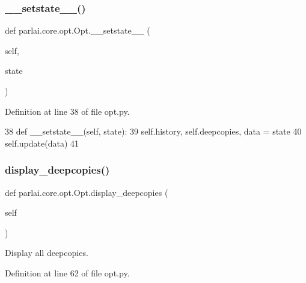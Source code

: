 \subsubsection{\texorpdfstring{\+\_\+\+\_\+setstate\+\_\+\+\_\+()}{\_\_setstate\_\_()}}
{\footnotesize\ttfamily def parlai.\+core.\+opt.\+Opt.\+\_\+\+\_\+setstate\+\_\+\+\_\+ (\begin{DoxyParamCaption}\item[{}]{self,  }\item[{}]{state }\end{DoxyParamCaption})}



Definition at line 38 of file opt.\+py.


\begin{DoxyCode}
38     \textcolor{keyword}{def }\_\_setstate\_\_(self, state):
39         self.history, self.deepcopies, data = state
40         self.update(data)
41 
\end{DoxyCode}
\mbox{\label{classparlai_1_1core_1_1opt_1_1Opt_acf39fc241e237d49671e61ff5ee8b95b}} 
\subsubsection{\texorpdfstring{display\+\_\+deepcopies()}{display\_deepcopies()}}
{\footnotesize\ttfamily def parlai.\+core.\+opt.\+Opt.\+display\+\_\+deepcopies (\begin{DoxyParamCaption}\item[{}]{self }\end{DoxyParamCaption})}

\begin{DoxyVerb}Display all deepcopies.
\end{DoxyVerb}
 

Definition at line 62 of file opt.\+py.


